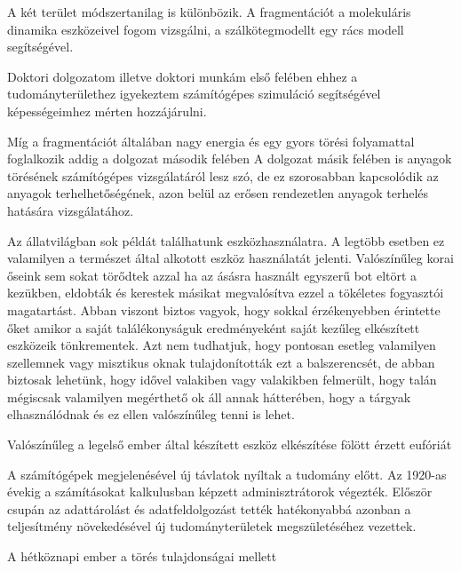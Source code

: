 A két terület módszertanilag is különbözik. A fragmentációt a molekuláris dinamika eszközeivel fogom vizsgálni, a szálkötegmodellt egy rács modell segítségével. 




Doktori dolgozatom illetve doktori munkám első felében ehhez a tudományterülethez igyekeztem számítógépes szimuláció segítségével képességeimhez mérten hozzájárulni. 

Míg a fragmentációt általában nagy energia és  egy gyors törési folyamattal foglalkozik addig a dolgozat második felében A dolgozat másik felében is anyagok törésének számítógépes vizsgálatáról lesz szó, de ez szorosabban kapcsolódik az anyagok terhelhetőségének, azon belül az erősen rendezetlen anyagok terhelés hatására  vizsgálatához.




Az állatvilágban sok példát találhatunk eszközhasználatra. A legtöbb esetben ez valamilyen a természet által alkotott eszköz használatát jelenti. Valószínűleg korai őseink sem sokat törődtek azzal ha az ásásra használt egyszerű bot eltört a kezükben, eldobták és kerestek másikat megvalósítva ezzel a tökéletes fogyasztói magatartást. Abban viszont biztos vagyok, hogy sokkal érzékenyebben érintette őket amikor a saját találékonyságuk eredményeként saját kezűleg elkészített eszközeik tönkrementek. Azt nem tudhatjuk, hogy pontosan esetleg valamilyen szellemnek vagy misztikus oknak tulajdonították ezt a balszerencsét, de abban biztosak lehetünk, hogy idővel valakiben vagy valakikben felmerült, hogy talán mégiscsak valamilyen megérthető ok áll annak hátterében, hogy a tárgyak elhasználódnak és ez ellen valószínűleg tenni is lehet. 

Valószínűleg a legelső ember által készített eszköz elkészítése fölött érzett eufóriát 

A számítógépek megjelenésével új távlatok nyíltak a tudomány előtt. Az 1920-as évekig a számításokat kalkulusban képzett adminisztrátorok végezték.  
Először csupán az adattárolást és adatfeldolgozást tették hatékonyabbá azonban a teljesítmény növekedésével új tudományterületek megszületéséhez vezettek. 

A hétköznapi ember a törés tulajdonságai mellett

